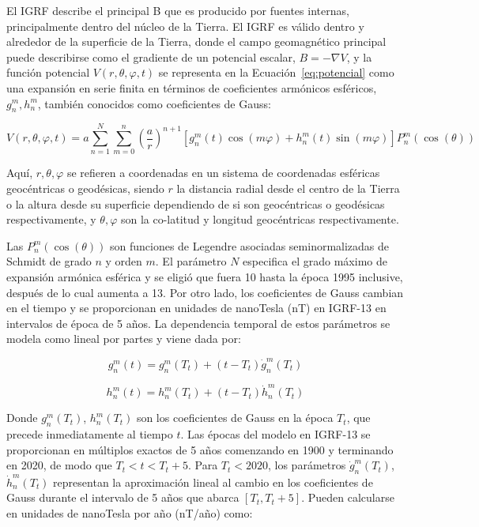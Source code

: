 El IGRF describe el principal \gls{B} que es producido por fuentes internas, principalmente dentro del núcleo de la Tierra. El IGRF es válido dentro y alrededor de la superficie de la Tierra, donde el campo geomagnético principal puede describirse como el gradiente de un potencial escalar, $B = -\nabla V$, y la función potencial $V(r, \theta, \varphi, t)$ se representa en la Ecuación~\ref{eq:potencial} como una expansión en serie finita en términos de coeficientes armónicos esféricos, $g_n^m, h_n^m$, también conocidos como coeficientes de Gauss:

\begin{equation}
	V(r, \theta, \varphi, t) = a \sum_{n=1}^{N} \sum_{m=0}^{n} \left( \frac{a}{r} \right)^{n+1} 
	\left[ g_n^m(t) \cos(m \varphi) + h_n^m(t) \sin(m \varphi) \right] P_n^m(\cos(\theta))
	\label{eq:potencial}
\end{equation}

Aquí, $r, \theta, \varphi$ se refieren a coordenadas en un sistema de coordenadas esféricas geocéntricas o geodésicas, siendo $r$ la distancia radial desde el centro de la Tierra o la altura desde su superficie dependiendo de si son geocéntricas o geodésicas respectivamente, y $\theta, \varphi$ son la co-latitud y longitud geocéntricas respectivamente. 

Las $P_n^m (\cos(\theta))$ son funciones de Legendre asociadas seminormalizadas de Schmidt de grado $n$ y orden $m$. El parámetro $N$ especifica el grado máximo de expansión armónica esférica y se eligió que fuera 10 hasta la época 1995 inclusive, después de lo cual aumenta a 13. Por otro lado, los coeficientes de Gauss cambian en el tiempo y se proporcionan en unidades de nanoTesla (nT) en IGRF-13 en intervalos de época de 5 años. La dependencia temporal de estos parámetros se modela como lineal por partes y viene dada por:

\begin{equation}
	g_n^m (t) = g_n^m (T_t) + (t - T_t) \dot{g}_n^m (T_t)
\end{equation}

\begin{equation}
	h_n^m (t) = h_n^m (T_t) + (t - T_t) \dot{h}_n^m (T_t)
\end{equation}

Donde $g_n^m (T_t)$, $h_n^m (T_t)$ son los coeficientes de Gauss en la época $T_t$, que precede inmediatamente al tiempo $t$. Las épocas del modelo en IGRF-13 se proporcionan en múltiplos exactos de 5 años comenzando en 1900 y terminando en 2020, de modo que $T_t < t < T_t+5$. Para $T_t < 2020$, los parámetros $\dot{g}_n^m (T_t)$, $\dot{h}_n^m (T_t)$ representan la aproximación lineal al cambio en los coeficientes de Gauss durante el intervalo de 5 años que abarca $[T_t, T_t+5]$. Pueden calcularse en unidades de nanoTesla por año (nT/año) como:

